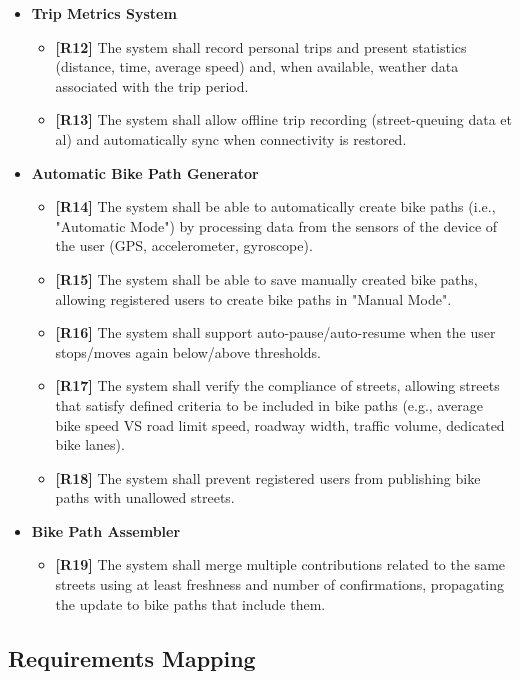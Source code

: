 \documentclass{Configuration_Files/PoliMi3i_thesis}
\begin{document}
\begin{itemize}
\begin{itemize}
			\item \textbf{[R11]} Registered users shall be able to record a trip.
	    \end{itemize}
	\item \textbf{Trip Metrics System}
	    \begin{itemize}
			\item \textbf{[R12]} The system shall record personal trips and present statistics (distance, time, average speed) and, when available, weather data associated with the trip period.
			\item \textbf{[R13]} The system shall allow offline trip recording (street-queuing data et al) and automatically sync when connectivity is restored.
	    \end{itemize}
	\item \textbf{Automatic Bike Path Generator}
	    \begin{itemize}
			\item \textbf{[R14]} The system shall be able to automatically create bike paths (i.e., "Automatic Mode") by processing data from the sensors of the device of the user (GPS, accelerometer, gyroscope).
			\item \textbf{[R15]} The system shall be able to save manually created bike paths, allowing registered users to create bike paths in "Manual Mode".
			\item \textbf{[R16]} The system shall support auto-pause/auto-resume when the user stops/moves again below/above thresholds.
			\item \textbf{[R17]} The system shall verify the compliance of streets, allowing streets that satisfy defined criteria to be included in bike paths (e.g., average bike speed VS road limit speed, roadway width, traffic volume, dedicated bike lanes).
			\item \textbf{[R18]} The system shall prevent registered users from publishing bike paths with unallowed streets.
	    \end{itemize}
	\item \textbf{Bike Path Assembler}
	    \begin{itemize}
			\item \textbf{[R19]} The system shall merge multiple contributions related to the same streets using at least freshness and number of confirmations, propagating the update to bike paths that include them.
	    \end{itemize}
\end{itemize}

\subsection{Requirements Mapping}
\end{document}
